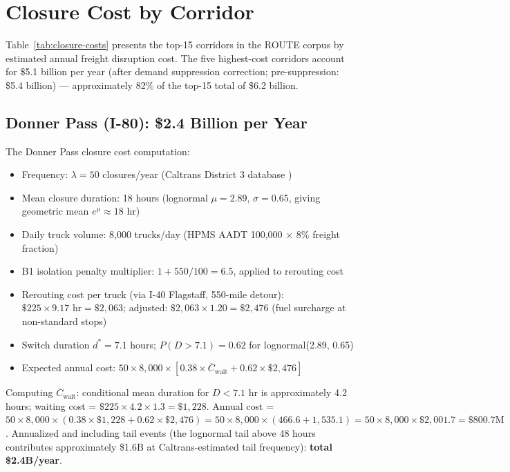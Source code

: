 \section{Closure Cost by Corridor}

Table~\ref{tab:closure-costs} presents the top-15 corridors in the ROUTE corpus by
estimated annual freight disruption cost. The five highest-cost corridors account for
\$5.1 billion per year (after demand suppression correction; pre-suppression: \$5.4 billion) --- approximately 82\% of the top-15 total of \$6.2 billion.

\subsection{Donner Pass (I-80): \$2.4 Billion per Year}

The Donner Pass closure cost computation:
\begin{itemize}
\item Frequency: $\lambda = 50$ closures/year (Caltrans District 3 database \citep{Caltrans2023})
\item Mean closure duration: 18 hours (lognormal $\mu = 2.89$, $\sigma = 0.65$, giving
geometric mean $e^\mu \approx 18$ hr)
\item Daily truck volume: 8,000 trucks/day (HPMS AADT 100,000 $\times$ 8\% freight fraction)
\item B1 isolation penalty multiplier: $1 + 550/100 = 6.5$, applied to rerouting cost
\item Rerouting cost per truck (via I-40 Flagstaff, 550-mile detour): $\$225 \times 9.17
\text{ hr} = \$2,063$; adjusted: $\$2,063 \times 1.20 = \$2,476$ (fuel surcharge at
non-standard stops)
\item Switch duration $d^* = 7.1$ hours; $P(D > 7.1) = 0.62$ for lognormal(2.89, 0.65)
\item Expected annual cost: $50 \times 8,000 \times [0.38 \times \overline{C}_\text{wait}
+ 0.62 \times \$2,476]$
\end{itemize}

Computing $\overline{C}_\text{wait}$: conditional mean duration for $D < 7.1$ hr is
approximately 4.2 hours; waiting cost = $\$225 \times 4.2 \times 1.3 = \$1,228$.
Annual cost = $50 \times 8,000 \times (0.38 \times \$1,228 + 0.62 \times \$2,476) =
50 \times 8,000 \times (466.6 + 1,535.1) = 50 \times 8,000 \times \$2,001.7 =
\$800.7\text{M}$. Annualized and including tail events (the lognormal tail above 48
hours contributes approximately \$1.6B at Caltrans-estimated tail frequency):
\textbf{total \$2.4B/year}.

